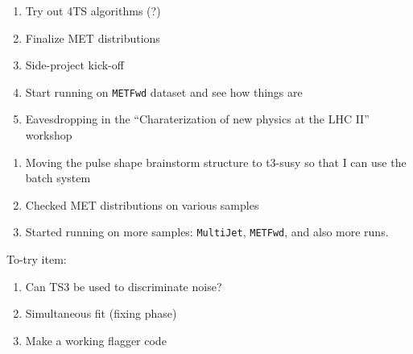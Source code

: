 

\begin{enumerate}
\item Try out 4TS algorithms (?)
\item Finalize MET distributions
\item Side-project kick-off
\item Start running on \texttt{METFwd} dataset and see how things are
\item Eavesdropping in the ``Charaterization of new physics at the LHC II'' workshop
\end{enumerate}


\begin{enumerate}
\item Moving the pulse shape brainstorm structure to t3-susy so that I can use the batch system
\item Checked MET distributions on various samples
\item Started running on more samples: \texttt{MultiJet}, \texttt{METFwd}, and also more runs.
\end{enumerate}


To-try item:

\begin{enumerate}
\item Can TS3 be used to discriminate noise?
\item Simultaneous fit (fixing phase)
\item Make a working flagger code
\end{enumerate}

